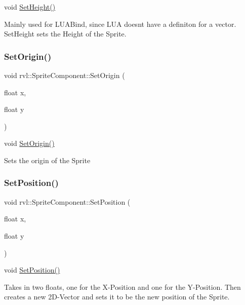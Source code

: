 void \hyperlink{classrvl_1_1_sprite_component_a01adb38d3fcc3df48008794b3ae17865}{Set\+Height()} 

Mainly used for L\+U\+A\+Bind, since L\+UA doesn\textquotesingle{}t have a definiton for a vector. Set\+Height sets the Height of the Sprite. \mbox{\label{classrvl_1_1_sprite_component_a980e38f678f105d9fa184389c1d8266d}} 
\subsubsection{\texorpdfstring{Set\+Origin()}{SetOrigin()}}
{\footnotesize\ttfamily void rvl\+::\+Sprite\+Component\+::\+Set\+Origin (\begin{DoxyParamCaption}\item[{float}]{x,  }\item[{float}]{y }\end{DoxyParamCaption})}



void \hyperlink{classrvl_1_1_sprite_component_a980e38f678f105d9fa184389c1d8266d}{Set\+Origin()} 

Sets the origin of the Sprite \mbox{\label{classrvl_1_1_sprite_component_ab849d5ea89e7743185a2595b4888800a}} 
\subsubsection{\texorpdfstring{Set\+Position()}{SetPosition()}}
{\footnotesize\ttfamily void rvl\+::\+Sprite\+Component\+::\+Set\+Position (\begin{DoxyParamCaption}\item[{float}]{x,  }\item[{float}]{y }\end{DoxyParamCaption})}



void \hyperlink{classrvl_1_1_sprite_component_ab849d5ea89e7743185a2595b4888800a}{Set\+Position()} 

Takes in two floats, one for the X-\/\+Position and one for the Y-\/\+Position. Then creates a new 2\+D-\/\+Vector and sets it to be the new position of the Sprite. \mbox{\label{classrvl_1_1_sprite_component_a615e08757168a43c867145c2021949b6}} 
